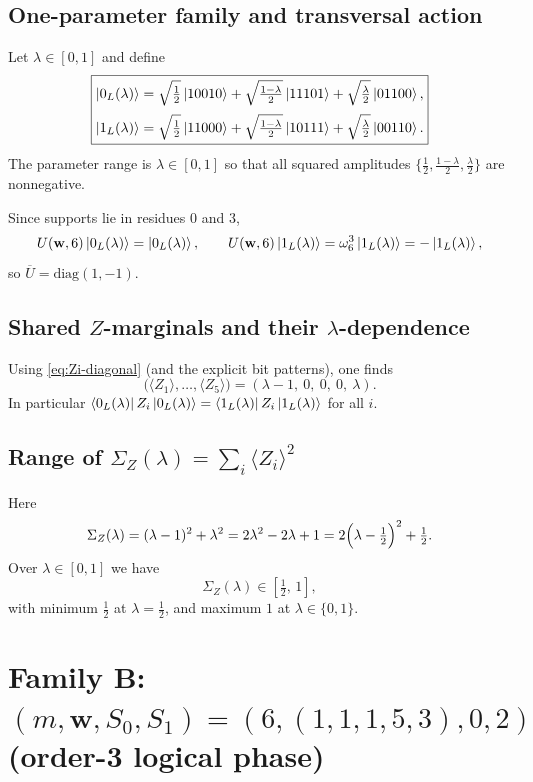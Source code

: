 \documentclass[11pt]{article}
\begin{document}
\subsection{One-parameter family and transversal action}
Let $\lambda\in[0,1]$ and define
\[
\boxed{
\begin{aligned}
\ket{0_L(\lambda)}
&=
\sqrt{\tfrac12}\ket{10010}
+\sqrt{\tfrac{1-\lambda}{2}}\ket{11101}
+\sqrt{\tfrac{\lambda}{2}}\ket{01100},\\[2pt]
\ket{1_L(\lambda)}
&=
\sqrt{\tfrac12}\ket{11000}
+\sqrt{\tfrac{1-\lambda}{2}}\ket{10111}
+\sqrt{\tfrac{\lambda}{2}}\ket{00110}.
\end{aligned}}
\]
The parameter range is $\lambda\in[0,1]$ so that all squared amplitudes
$\{\tfrac12,\tfrac{1-\lambda}{2},\tfrac{\lambda}{2}\}$ are nonnegative.

Since supports lie in residues $0$ and $3$,
\[
U(\mathbf w,6)\ket{0_L(\lambda)}=\ket{0_L(\lambda)},\qquad
U(\mathbf w,6)\ket{1_L(\lambda)}=\omega_6^{3}\ket{1_L(\lambda)}=-\ket{1_L(\lambda)},
\]
so $\overline U=\mathrm{diag}(1,-1)$.

\subsection{Shared $Z$-marginals and their $\lambda$-dependence}
Using \eqref{eq:Zi-diagonal} (and the explicit bit patterns), one finds
\[
\boxed{
\bigl(\langle Z_1\rangle,\dots,\langle Z_5\rangle\bigr)
=
(\lambda-1,\ 0,\ 0,\ 0,\ \lambda).
}
\]
In particular $\bra{0_L(\lambda)}Z_i\ket{0_L(\lambda)}=\bra{1_L(\lambda)}Z_i\ket{1_L(\lambda)}$ for all $i$.

\subsection{Range of \texorpdfstring{$\Sigma_Z(\lambda)=\sum_i\langle Z_i\rangle^2$}{sum of Zi squares}}
Here
\[
\Sigma_Z(\lambda)=(\lambda-1)^2+\lambda^2=2\lambda^2-2\lambda+1
=2\Bigl(\lambda-\tfrac12\Bigr)^2+\tfrac12.
\]
Over $\lambda\in[0,1]$ we have
\[
\boxed{\Sigma_Z(\lambda)\in\left[\tfrac12,\,1\right],}
\]
with minimum $\tfrac12$ at $\lambda=\tfrac12$, and maximum $1$ at $\lambda\in\{0,1\}$.

\bigskip

\section{Family B: $(m,\mathbf w,S_0,S_1)=(6,(1,1,1,5,3),0,2)$ (order-3 logical phase)}
\end{document}
